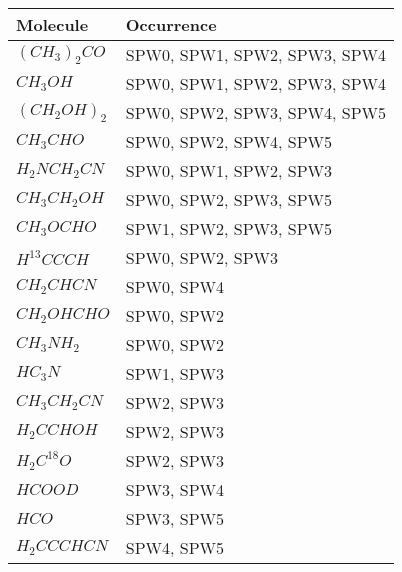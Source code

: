 \documentclass[10pt]{article}
\begin{document}
\begin{tabular}{p{2cm} p{8cm}}
\hline
Molecule & Occurrence \\
\hline
\hline
$(CH_{3})_{2}CO$ & SPW0, SPW1, SPW2, SPW3, SPW4 \\
$CH_{3}OH$ & SPW0, SPW1, SPW2, SPW3, SPW4 \\
$(CH_{2}OH)_{2}$ & SPW0, SPW2, SPW3, SPW4, SPW5 \\
$CH_{3}CHO$ & SPW0, SPW2, SPW4, SPW5 \\
$H_{2}NCH_{2}CN$ & SPW0, SPW1, SPW2, SPW3 \\
$CH_{3}CH_{2}OH$ & SPW0, SPW2, SPW3, SPW5 \\
$CH_{3}OCHO$ & SPW1, SPW2, SPW3, SPW5 \\
$H^{13}CCCH$ & SPW0, SPW2, SPW3 \\
$CH_{2}CHCN$ & SPW0, SPW4 \\
$CH_{2}OHCHO$ & SPW0, SPW2 \\
$CH_{3}NH_{2}$ & SPW0, SPW2 \\
$HC_{3}N$ & SPW1, SPW3 \\
$CH_{3}CH_{2}CN$ & SPW2, SPW3 \\
$H_{2}CCHOH$ & SPW2, SPW3 \\
$H_{2}C^{18}O$ & SPW2, SPW3 \\
$HCOOD$ & SPW3, SPW4 \\
$HCO$ & SPW3, SPW5 \\
$H_{2}CCCHCN$ & SPW4, SPW5 \\
\hline
\end{tabular}
\end{document}
